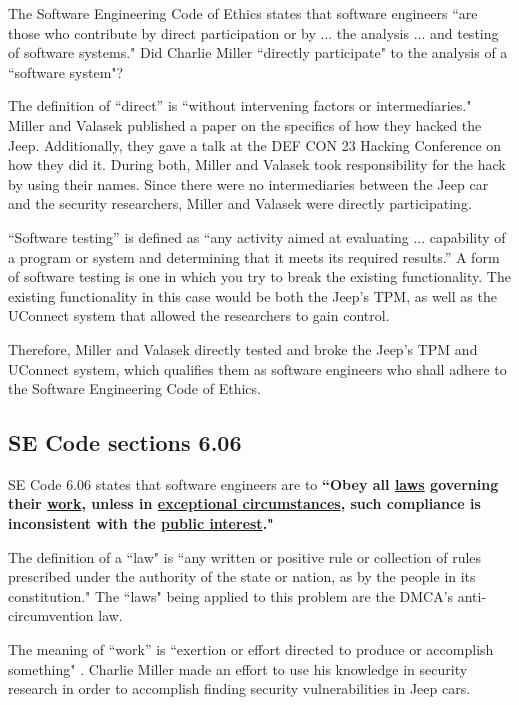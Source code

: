 \documentclass[12pt]{article}
\begin{document}
\begin{multicols}{2}
The Software Engineering Code of Ethics states that software engineers ``are those who contribute by direct participation or by ... the analysis ... and testing of software systems."\cite{seCode} Did Charlie Miller ``directly participate" to the analysis of a ``software system"?

The definition of ``direct'' is ``without intervening factors or intermediaries."\cite{dictionary}
Miller and Valasek published a paper on the specifics of how they hacked the Jeep. \cite{officialPaper} Additionally, they gave a talk at the DEF CON 23 Hacking Conference on how they did it. \cite{youtube} During both, Miller and Valasek took responsibility for the hack by using their names.\cite{officialPaper}\cite{youtube} Since there were no intermediaries between the Jeep car and the security researchers, Miller and Valasek were directly participating. 

``Software testing'' is defined as ``any activity aimed at evaluating ... capability of a program or system and determining that it meets its required results.''\cite{softwareTesting} A form of software testing is one in which you try to break the existing functionality. \cite{softwareTesting}\cite{breakTests} The existing functionality in this case would be both the Jeep's TPM, as well as the UConnect system that allowed the researchers to gain control. 

Therefore, Miller and Valasek directly tested and broke the Jeep's TPM and UConnect system, which qualifies them as software engineers who shall adhere to the Software Engineering Code of Ethics.

\subsection{SE Code sections 6.06}
SE Code 6.06 states that software engineers are to \textbf{``Obey all \underline{laws} governing their \underline{work}, unless in \underline{exceptional circumstances}, such compliance is inconsistent with the \underline{public interest}."} \cite{seCode}

The definition of a ``law" is ``any written or positive rule or collection of rules prescribed under the authority of the state or nation, as by the people in its constitution."\cite{dictionary} The ``laws" being applied to this problem are the DMCA's anti-circumvention law. 

The meaning of ``work'' is ``exertion or effort directed to produce or accomplish something" \cite{dictionary}. Charlie Miller made an effort to use his knowledge in security research in order to accomplish finding security vulnerabilities in Jeep cars.\cite{officialPaper}


\end{multicols}
\end{document}
